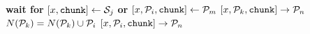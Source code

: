 \documentclass{article}
\begin{document}
\pagestyle{empty}

\newcommand{\send}{\Rightarrow}
\newcommand{\sendto}{\rightarrow}
\algrenewcommand{}

\begin{algorithmic}

  \State \textbf{wait for} $[x,\mathtt{chunk}] \gets {\cal S}_j$ \textbf{or} $[x,{\cal P}_i,\mathtt{chunk}] \gets {\cal P}_m$
  \State $[x,{\cal P}_k,\mathtt{chunk}] \sendto {\cal P}_n$
  \EndFor
  \Else
  $N({\cal P}_k) = N({\cal P}_k) \cup {\cal P}_i$
  \EndIf
  \State $[x,{\cal P}_i,\mathtt{chunk}] \sendto {\cal P}_n$
  \EndIf
  \EndFor
  \EndIf
  \EndWhile
  \EndProcedure
  
\end{algorithmic}
\end{document}
